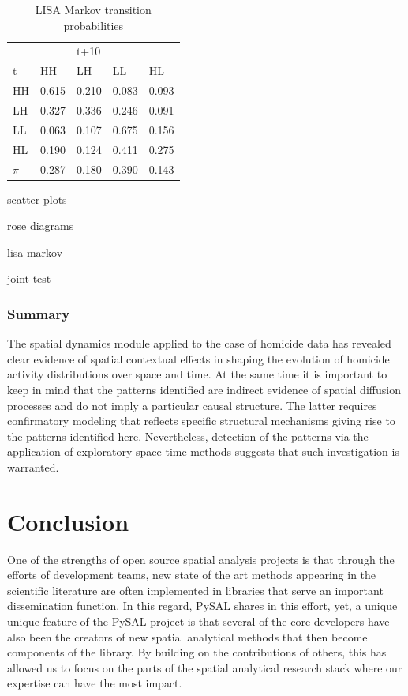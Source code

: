 \documentclass[11pt, titlepage]{article}
\begin{document}
\begin{table}
  \centering
  \small
\begin{tabular}{|l|llll|}\hline
  & &t+10 & &\\
  t&HH&LH&LL&HL\\
  \hline
HH&0.615 &0.210 &0.083 &0.093\\
LH&0.327 &0.336 &0.246 &0.091\\
LL&0.063 &0.107 &0.675 &0.156\\
HL&0.190 &0.124 &0.411 &0.275\\
\hline
$\pi$&0.287 &0.180 &0.390 &0.143\\
\hline
\end{tabular}
\caption{LISA Markov transition probabilities}
\label{t:lm}
\end{table}



scatter plots

rose diagrams

lisa  markov


joint test


\subsubsection{Summary}
The spatial dynamics module applied to the case of homicide data has
revealed clear evidence of spatial contextual effects in shaping the
evolution of homicide activity distributions over space and time. At the
same time it is important to keep in mind that the patterns identified
are indirect evidence of spatial diffusion processes and do not imply a
particular causal structure. The latter requires confirmatory modeling
that reflects specific structural mechanisms giving rise to the patterns
identified here. Nevertheless, detection of the patterns via the
application of exploratory space-time methods suggests that such investigation is
warranted.

\section{Conclusion}

One of the strengths of open source spatial analysis projects is that
through the efforts of development teams, new state of the art methods
appearing in the scientific literature are often implemented in
libraries that serve an important dissemination function. In this
regard, PySAL shares in this effort, yet, a unique unique feature of the
PySAL project is that several of the core developers have also been the
creators of new spatial analytical methods that then become components
of the library. By building on the contributions of others, this has
allowed us to focus on the parts of the spatial analytical research
stack where our expertise can have the most impact.
\end{document}
